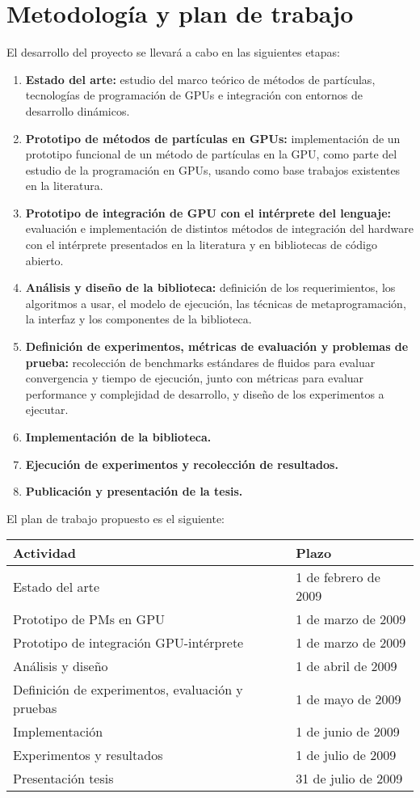 \documentclass[11pt,spanish]{article}
\newcommand{\tnhl}{\tabularnewline\hline}
\begin{document}
\section{Metodología y plan de trabajo}
El desarrollo del proyecto se llevará a cabo en las siguientes etapas:
\begin{enumerate}
    \item \textbf{Estado del arte:}
        estudio del marco teórico de métodos de partículas, tecnologías de
        programación de GPUs e integración con entornos de desarrollo dinámicos.
    \item \textbf{Prototipo de métodos de partículas en GPUs:}
        implementación de un prototipo funcional de un método de partículas en
        la GPU, como parte del estudio de la programación en GPUs, usando como
        base trabajos existentes en la literatura.
    \item \textbf{Prototipo de integración de GPU con el intérprete del lenguaje:}
        evaluación e implementación de distintos métodos de integración del
        hardware con el intérprete presentados en la literatura y en bibliotecas
        de código abierto.
    \item \textbf{Análisis y diseño de la biblioteca:}
        definición de los requerimientos, los algoritmos a usar, el modelo de
        ejecución, las técnicas de metaprogramación, la interfaz y los
        componentes de la biblioteca.
    \item \textbf{Definición de experimentos, métricas de evaluación y problemas de prueba:}
        recolección de benchmarks estándares de fluidos para evaluar convergencia y
        tiempo de ejecución, junto con métricas para evaluar performance y
        complejidad de desarrollo, y diseño de los experimentos a ejecutar.
    \item \textbf{Implementación de la biblioteca.}
    \item \textbf{Ejecución de experimentos y recolección de resultados.}
    \item \textbf{Publicación y presentación de la tesis.}
\end{enumerate}

El plan de trabajo propuesto es el siguiente:

\begin{tabular}{|%
    >{\raggedright\hspace{0pt}} p{} |%
    >{\raggedright\hspace{0pt}} p{} |%
}\hline
    \textbf{Actividad} & \textbf{Plazo}\tnhl
    Estado del arte           & 1 de febrero de 2009 \tnhl
    Prototipo de PMs en GPU   & 1 de marzo de 2009 \tnhl
    Prototipo de integración
    GPU-intérprete            & 1 de marzo de 2009 \tnhl
    Análisis y diseño         & 1 de abril de 2009 \tnhl
    Definición de experimentos, evaluación
    y pruebas                 & 1 de mayo de 2009 \tnhl
    Implementación            & 1 de junio de 2009 \tnhl
    Experimentos y resultados & 1 de julio de 2009 \tnhl
    Presentación tesis        & 31 de julio de 2009 \tnhl
\end{tabular}
\end{document}

